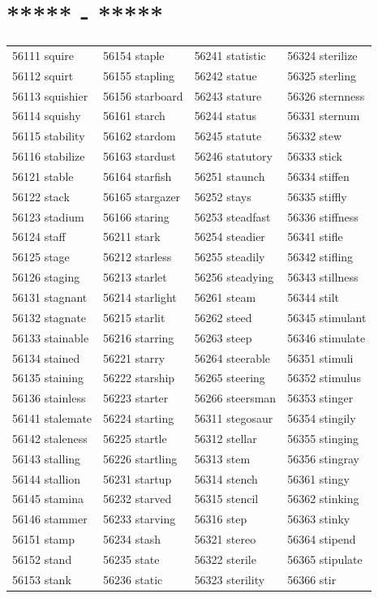 \documentclass[10pt, oneside]{book}
\begin{document}
\begin{table}[h]
	\centering
	\section*{***** - *****}
	\begin{tabular}{l l l l}
56111 squire &56154 staple &56241 statistic &56324 sterilize\\
56112 squirt &56155 stapling &56242 statue &56325 sterling\\
56113 squishier &56156 starboard &56243 stature &56326 sternness\\
56114 squishy &56161 starch &56244 status &56331 sternum\\
56115 stability &56162 stardom &56245 statute &56332 stew\\
56116 stabilize &56163 stardust &56246 statutory &56333 stick\\
56121 stable &56164 starfish &56251 staunch &56334 stiffen\\
56122 stack &56165 stargazer &56252 stays &56335 stiffly\\
56123 stadium &56166 staring &56253 steadfast &56336 stiffness\\
56124 staff &56211 stark &56254 steadier &56341 stifle\\
56125 stage &56212 starless &56255 steadily &56342 stifling\\
56126 staging &56213 starlet &56256 steadying &56343 stillness\\
56131 stagnant &56214 starlight &56261 steam &56344 stilt\\
56132 stagnate &56215 starlit &56262 steed &56345 stimulant\\
56133 stainable &56216 starring &56263 steep &56346 stimulate\\
56134 stained &56221 starry &56264 steerable &56351 stimuli\\
56135 staining &56222 starship &56265 steering &56352 stimulus\\
56136 stainless &56223 starter &56266 steersman &56353 stinger\\
56141 stalemate &56224 starting &56311 stegosaur &56354 stingily\\
56142 staleness &56225 startle &56312 stellar &56355 stinging\\
56143 stalling &56226 startling &56313 stem &56356 stingray\\
56144 stallion &56231 startup &56314 stench &56361 stingy\\
56145 stamina &56232 starved &56315 stencil &56362 stinking\\
56146 stammer &56233 starving &56316 step &56363 stinky\\
56151 stamp &56234 stash &56321 stereo &56364 stipend\\
56152 stand &56235 state &56322 sterile &56365 stipulate\\
56153 stank &56236 static &56323 sterility &56366 stir\\
	\end{tabular}
 \end{table}
\end{document}
